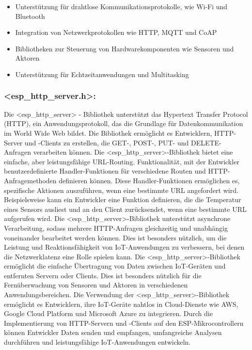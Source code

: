 \begin{itemize}
    \item Unterstützung für drahtlose Kommunikationsprotokolle, wie Wi-Fi und Bluetooth
    \item Integration von Netzwerkprotokollen wie HTTP, MQTT und CoAP
    \item Bibliotheken zur Steuerung von Hardwarekomponenten wie Sensoren und Aktoren
    \item Unterstützung für Echtzeitanwendungen und Multitasking
\end{itemize}

\subsubsection*{<esp\_http\_server.h>:}

Die <esp\_http\_server> - Bibliothek unterstützt das Hypertext Transfer Protocol (HTTP), ein Anwendungsprotokoll, das die Grundlage für Datenkommunikation im World Wide Web bildet. 
Die Bibliothek ermöglicht es Entwicklern, HTTP-Server und -Clients zu erstellen, die GET-, POST-, PUT- und DELETE-Anfragen verarbeiten können.
Die <esp\_http\_server>-Bibliothek bietet eine einfache, aber leistungsfähige URL-Routing.
Funktionalität, mit der Entwickler benutzerdefinierte Handler-Funktionen für verschiedene Routen und HTTP-Anfragemethoden definieren können. 
Diese Handler-Funktionen ermöglichen es, spezifische Aktionen auszuführen, wenn eine bestimmte URL angefordert wird. 
Beispielsweise kann ein Entwickler eine Funktion definieren, die die Temperatur eines Sensors ausliest und an den Client zurücksendet, wenn eine bestimmte URL aufgerufen wird.
Die <esp\_http\_server>-Bibliothek unterstützt asynchrone Verarbeitung, sodass mehrere HTTP-Anfragen gleichzeitig und unabhängig voneinander bearbeitet werden können. 
Dies ist besonders nützlich, um die Leistung und Reaktionsfähigkeit von IoT-Anwendungen zu verbessern, bei denen die Netzwerklatenz eine Rolle spielen kann.
Die <esp\_http\_server>-Bibliothek ermöglicht die einfache Übertragung von Daten zwischen IoT-Geräten und entfernten Servern oder Clients. 
\newline
Dies ist besonders nützlich für die Fernüberwachung von Sensoren und Aktoren in verschiedenen Anwendungsbereichen.
Die Verwendung der <esp\_http\_server>-Bibliothek ermöglicht es Entwicklern, ihre IoT-Geräte nahtlos in Cloud-Dienste wie AWS, Google Cloud Platform und Microsoft Azure zu integrieren. 
Durch die Implementierung von HTTP-Servern und -Clients auf den ESP-Mikrocontrollern können Entwickler Daten senden und empfangen, umfangreiche Analysen durchführen und leistungsfähige IoT-Anwendungen entwickeln.
